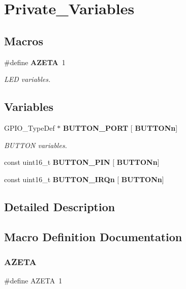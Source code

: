 \section{Private\+\_\+\+Variables}
\label{group___private___variables}
\subsection*{Macros}
\begin{DoxyCompactItemize}
\item 
\#define \textbf{ A\+Z\+E\+TA}~1
\begin{DoxyCompactList}\small\item\em L\+ED variables. \end{DoxyCompactList}\end{DoxyCompactItemize}
\subsection*{Variables}
\begin{DoxyCompactItemize}
\item 
G\+P\+I\+O\+\_\+\+Type\+Def $\ast$ \textbf{ B\+U\+T\+T\+O\+N\+\_\+\+P\+O\+RT} [\textbf{ B\+U\+T\+T\+O\+Nn}]
\begin{DoxyCompactList}\small\item\em B\+U\+T\+T\+ON variables. \end{DoxyCompactList}\item 
const uint16\+\_\+t \textbf{ B\+U\+T\+T\+O\+N\+\_\+\+P\+IN} [\textbf{ B\+U\+T\+T\+O\+Nn}]
\item 
const uint16\+\_\+t \textbf{ B\+U\+T\+T\+O\+N\+\_\+\+I\+R\+Qn} [\textbf{ B\+U\+T\+T\+O\+Nn}]
\end{DoxyCompactItemize}


\subsection{Detailed Description}


\subsection{Macro Definition Documentation}
\mbox{\label{group___private___variables_ga69c00bf7946b004e26bbf725ce64f43d}} 
\subsubsection{A\+Z\+E\+TA}
{\footnotesize\ttfamily \#define A\+Z\+E\+TA~1}



